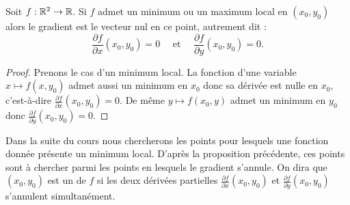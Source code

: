 \begin{proposition}{}{}
	Soit $f : \mathbb{R}^2 \to \mathbb{R}$. Si $f$ admet un minimum ou un maximum local en $(x_0,y_0)$ alors le gradient est le vecteur nul en ce point, autrement dit :
	$$
	\frac{\partial f}{\partial x}(x_0,y_0) = 0 
	\quad \text{ et  }\quad
	\frac{\partial f}{\partial y}(x_0,y_0) = 0.
	$$
\end{proposition}

\begin{proof}
	Prenons le cas d'un minimum local.
	La fonction d'une variable $x \mapsto f(x, y_0)$ admet aussi un minimum en $x_0$ donc sa dérivée est nulle en $x_0$, c'est-à-dire $\frac{\partial f}{\partial x}(x_0,y_0) = 0$. De même $y \mapsto f(x_0, y)$ admet un minimum en $y_0$ donc $\frac{\partial f}{\partial y}(x_0,y_0) = 0$. 
\end{proof}


Dans la suite du cours nous chercherons les points pour lesquels une fonction donnée présente un minimum local.
D'après la proposition précédente, ces points sont à chercher parmi les points en lesquels le gradient s'annule. On dira que $(x_0,y_0)$ est un  de $f$ si
les deux dérivées partielles $\frac{\partial f}{\partial x}(x_0,y_0)$ et $\frac{\partial f}{\partial y}(x_0,y_0)$ s'annulent simultanément.

